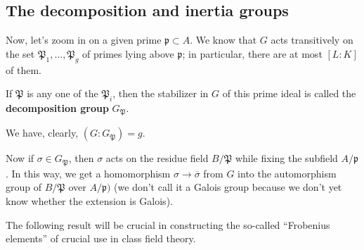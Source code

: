 \subsection{The decomposition and inertia groups}
Now, let's zoom in on a given prime $\mathfrak{p} \subset A$.  We know that $G$ acts transitively on the set $\mathfrak{P}_1, \dots, \mathfrak{P}_g$ of primes lying above $\mathfrak{p}$; in particular, there are at most $[L:K]$ of them.  

\begin{definition} If $\mathfrak{P}$ is any one of the $\mathfrak{P}_i$, then the stabilizer in $G$ of this prime ideal is called the \textbf{decomposition group} $G_{\mathfrak{P}}$. \end{definition}
We have, clearly, $(G: G_{\mathfrak{P}}) = g$.

Now if $ \sigma \in G_{\mathfrak{P}}$, then $\sigma$ acts on the residue field $B/\mathfrak{P}$ while fixing the subfield $A/\mathfrak{p}$.  In this way, we get a homomorphism $\sigma \to \overline{\sigma}$ from $G$ into the automorphism group of $B/\mathfrak{P}$ over $A/\mathfrak{p})$ (we don't call it a Galois group because we don't yet know whether the extension is Galois).

The following result will be crucial in constructing the so-called ``Frobenius elements'' of crucial use in class field theory.

